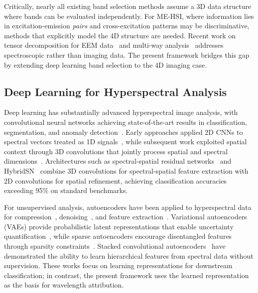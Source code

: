 Critically, nearly all existing band selection methods assume a 3D data structure where bands can be evaluated independently.
For ME-HSI, where information lies in excitation-emission \emph{pairs} and cross-excitation patterns may be discriminative, methods that explicitly model the 4D structure are needed.
Recent work on tensor decomposition for EEM data~\cite{murphy2013fluorescence} and multi-way analysis~\cite{bro1997parafac} addresses spectroscopic rather than imaging data.
The present framework bridges this gap by extending deep learning band selection to the 4D imaging case.

\subsection{Deep Learning for Hyperspectral Analysis}
\label{sec:related_dl}

Deep learning has substantially advanced hyperspectral image analysis, with convolutional neural networks achieving state-of-the-art results in classification, segmentation, and anomaly detection~\cite{li2019deep,paoletti2019deep}.
Early approaches applied 2D CNNs to spectral vectors treated as 1D signals~\cite{hu2015deep}, while subsequent work exploited spatial context through 3D convolutions that jointly process spatial and spectral dimensions~\cite{chen2016deep}.
Architectures such as spectral-spatial residual networks~\cite{zhong2017spectral} and HybridSN~\cite{roy2020hybridsn} combine 3D convolutions for spectral-spatial feature extraction with 2D convolutions for spatial refinement, achieving classification accuracies exceeding 95\% on standard benchmarks.

For unsupervised analysis, autoencoders have been applied to hyperspectral data for compression~\cite{chen2014deep}, denoising~\cite{vincent2008extracting}, and feature extraction~\cite{mou2017unsupervised}.
Variational autoencoders (VAEs) provide probabilistic latent representations that enable uncertainty quantification~\cite{kingma2013auto}, while sparse autoencoders encourage disentangled features through sparsity constraints~\cite{ng2011sparse}.
Stacked convolutional autoencoders~\cite{masci2011stacked} have demonstrated the ability to learn hierarchical features from spectral data without supervision.
These works focus on learning representations for downstream classification; in contrast, the present framework uses the learned representation as the basis for wavelength attribution.


